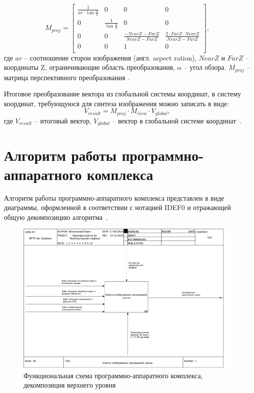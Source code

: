 \begin{equation}
M_{proj} = 
\begin{bmatrix}
    \frac{1}{ar \cdot \tan{\frac{\alpha}{2}}} & 0 & 0 & 0 \\
    0 & \frac{1}{\tan{\frac{\alpha}{2}}} & 0 & 0 \\
    0 & 0 & \frac{-NearZ-FarZ}{NearZ-FarZ} & \frac{2 \cdot FarZ \cdot NearZ}{NearZ-FarZ} \\
    0   &  0  &  1  & 0 \\  
\end{bmatrix},
\end{equation}
где $ar$ -- соотношение сторон изображения (англ. aspect ration), $NearZ$ и $FarZ$ -- координаты Z, ограничивающие область преобразования, $\alpha$ -- угол обзора. $M_{proj}$ -- матрица перспективного преобразования \cite{perspective}. 

Итоговое преобразование вектора из глобальной системы координат, в систему координат, требующуюся для синтеза изображения можно записать в виде:
\begin{equation}
V_{result} = M_{proj} \cdot M_{view} \cdot V_{global},
\end{equation}
где $V_{result}$ -- итоговый вектор, $V_{global}$ -- вектор в глобальной системе координат~\cite{projection}.

\section{Алгоритм работы программно-аппаратного комплекса}

Алгоритм работы программно-аппаратного комплекса представлен в виде диаграммы, оформленной в
соответствии с нотацией IDEF0 и отражающей общую декомпозицию
алгоритма~\cite{idef0}.

\begin{figure}[H]
	\centering
	\includegraphics[height=0.45\textheight]{inc/img/01_A0.pdf}
	\caption{Функциональная схема программно-аппаратного комплекса, декомпозиция верхнего уровня}
	\label{fig:a01}
\end{figure}


